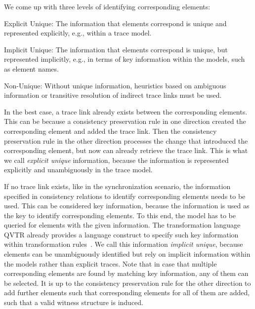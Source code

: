 We come up with three levels of identifying corresponding elements:
\begin{properdescription}
    \item[Explicit Unique:] The information that elements correspond is unique and represented explicitly, e.g., within a trace model. %
    \item[Implicit Unique:] The information that elements correspond is unique, but represented implicitly, e.g., in terms of key information within the models, such as element names. %
    \item[Non-Unique:] Without unique information, heuristics based on ambiguous information or transitive resolution of indirect trace links must be used.
\end{properdescription}

In the best case, a trace link already exists between the corresponding elements. This can be because a consistency preservation rule in one direction created the corresponding element and added the trace link. Then the consistency preservation rule in the other direction processes the change that introduced the corresponding element, but now can already retrieve the trace link.
This is what we call \emph{explicit unique} information, because the information is represented explicitly and unambiguously in the trace model.

If no trace link exists, like in the synchronization scenario, the information specified in consistency relations to identify corresponding elements needs to be used.
This can be considered key information, because the information is used as the key to identify corresponding elements.
To this end, the model has to be queried for elements with the given information.
The transformation language \gls{QVTR} already provides a language construct to specify such key information within transformation rules~\cite[7.10.2.]{qvt}.
We call this information \emph{implicit unique}, because elements can be unambiguously identified but rely on implicit information within the models rather than explicit traces.
Note that in case that multiple corresponding elements are found by matching key information, any of them can be selected.
It is up to the consistency preservation rule for the other direction to add further elements such that corresponding elements for all of them are added, such that a valid witness structure is induced.

